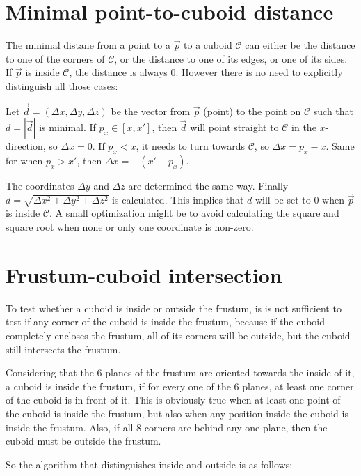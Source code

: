 \documentclass[a4paper,10pt,abstracton,notitlepage]{scrreprt}
\begin{document}
\section{Minimal point-to-cuboid distance}
The minimal distane from a point to a $\overrightarrow{p}$ to a cuboid $\mathcal{C}$ can either be the distance to one of the corners of $\mathcal{C}$, or the distance to one of its edges, or one of its sides. If $\overrightarrow{p}$ is inside $\mathcal{C}$, the distance is always $0$. However there is no need to explicitly distinguish all those cases:

Let $\overrightarrow{d} = (\Delta x, \Delta y, \Delta z)$ be the vector from $\overrightarrow{p}$ (point) to the point on $\mathcal{C}$ such that $d = |\overrightarrow{d}|$ is minimal. If $p_{x} \in [x, x']$, then $\overrightarrow{d}$ will point straight to $\mathcal{C}$ in the $x$-direction, so $\Delta x = 0$. If $p_{x} < x$, it needs to turn towards $\mathcal{C}$, so $\Delta x = p_{x} - x$. Same for when $p_{x} > x'$, then $\Delta x = -(x' - p_{x})$.

The coordinates $\Delta y$ and $\Delta z$ are determined the same way. Finally $d = \sqrt{\Delta x^{2} + \Delta y^{2} + \Delta z^{2}}$ is calculated. This implies that $d$ will be set to $0$ when $\overrightarrow{p}$ is inside $\mathcal{C}$. A small optimization might be to avoid calculating the square and square root when none or only one coordinate is non-zero.

\section{Frustum-cuboid intersection}
To test whether a cuboid is inside or outside the frustum, is is not sufficient to test if any corner of the cuboid is inside the frustum, because if the cuboid completely encloses the frustum, all of its corners will be outside, but the cuboid still intersects the frustum.

Considering that the 6 planes of the frustum are oriented towards the inside of it, a cuboid is inside the frustum, if for every one of the 6 planes, at least one corner of the cuboid is in front of it. This is obviously true when at least one point of the cuboid is inside the frustum, but also when any position inside the cuboid is inside the frustum. Also, if all 8 corners are behind any one plane, then the cuboid must be outside the frustum.

So the algorithm that distinguishes inside and outside is as follows:
\end{document}
